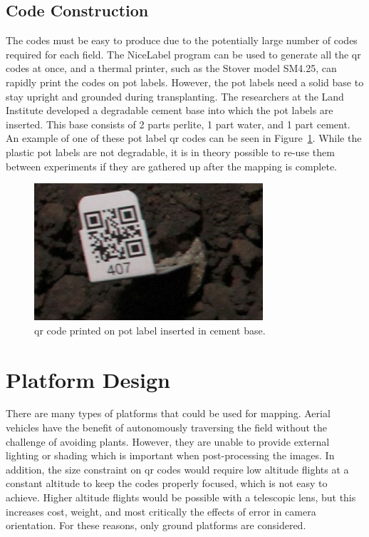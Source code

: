 \subsection{Code Construction}

The codes must be easy to produce due to the potentially large number of codes required for each field.  The NiceLabel program can be used to generate all the \ac{qr} codes at once, and a thermal printer, such as the Stover model SM4.25, can rapidly print the codes on pot labels.  However, the pot labels need a solid base to stay upright and grounded during transplanting. The researchers at the Land Institute developed a degradable cement base into which the pot labels are inserted.  This base consists of 2 parts perlite, 1 part water, and 1 part cement.  An example of one of these pot label \ac{qr} codes can be seen in Figure~\ref{QR_code}.  While the plastic pot labels are not degradable, it is in theory possible to re-use them between experiments if they are gathered up after the mapping is complete.

\begin{figure}
	\centering
    \includegraphics[height=2in]{figures/qr_code_407.jpg}
    \caption[Pot label QR code]{\ac{qr} code printed on pot label inserted in cement base.}
    \label{QR_code}
\end{figure}

\section{Platform Design}
\label{section:platform_design}

There are many types of platforms that could be used for mapping.  Aerial vehicles have the benefit of autonomously traversing the field without the challenge of avoiding plants. However, they are unable to provide external lighting or shading which is important when post-processing the images. In addition, the size constraint on \ac{qr} codes would require low altitude flights at a constant altitude to keep the codes properly focused, which is not easy to achieve.  Higher altitude flights would be possible with a telescopic lens, but this increases cost, weight, and most critically the effects of error in camera orientation.  For these reasons, only ground platforms are considered.

